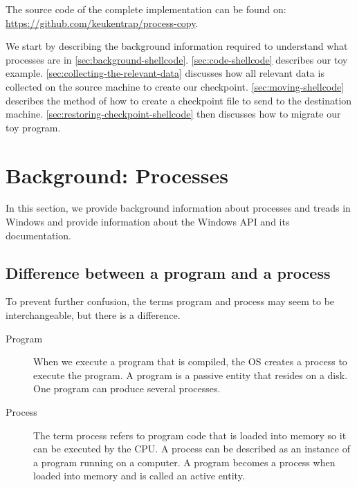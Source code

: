 \documentclass[a4paper, 11pt, english]{report}
\begin{document}
The source code of the complete implementation can be found on: \url{https://github.com/keukentrap/process-copy}.

We start by describing the background information required to understand what processes are in \autoref{sec:background-shellcode}. \autoref{sec:code-shellcode} describes our toy example.
\autoref{sec:collecting-the-relevant-data} discusses how all relevant data is collected on the source machine to create our checkpoint. \autoref{sec:moving-shellcode} describes the method of how to create a checkpoint file to send to the destination machine. \autoref{sec:restoring-checkpoint-shellcode} then discusses how to migrate our toy program. 

\section{Background: Processes}
\label{sec:background-shellcode}
In this section, we provide background information about processes and treads in Windows and provide information about the Windows API and its documentation.

\subsection{Difference between a program and a process}
\label{sec:program-vs-process}
To prevent further confusion, the terms program and process may seem to be interchangeable, but there is a difference.
\begin{description}%
	\item[Program] When we execute a program that is compiled, the OS creates a process to execute the program. A program is a passive entity that resides on a disk. One program can produce several processes.
	\item[Process] The term process refers to program code that is loaded into memory so it can be executed by the CPU. A process can be described as an instance of a program running on a computer. A program becomes a process when loaded into memory and is called an active entity.
\end{description}
\end{document}
